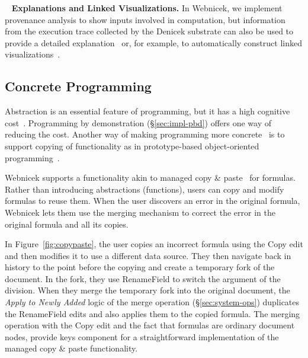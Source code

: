 \documentclass[sigconf,anonymous,screen]{acmart}
\newcommand{\ident}[1]{{\sffamily #1}}
\newcommand{\note}[1]{\textcolor{red}{#1}}
\DeclareRobustCommand{\keyideabox}[3]{\begin{tcolorbox}[breakable,
  boxsep=5pt,left=0pt,right=0pt,top=0pt,bottom=0pt,width=\dimexpr\columnwidth\relax,
  colback=gray!20,colframe=gray!20,
  enlarge bottom by=0pt,enlarge top by=0pt,
  arc=0pt,outer arc=0pt]
\lettrine[lraise=0.3]{\LARGE #1}{~}
\small \textbf{#2.} #3
\end{tcolorbox}
}
\begin{document}
\keyideabox{\faBarChart}{Explanations and Linked Visualizations}{In Webnicek, we implement
provenance analysis to show inputs involved in computation, but information from the execution
trace collected by the Denicek substrate can also be used to provide a detailed
explanation~\cite{perera-2012-functional} or, for example, to automatically construct
linked visualizations~\cite{perera-2022-linked}.}


\subsection{Concrete Programming}
\label{sec:impl-copy}

Abstraction is an essential feature of programming, but it has a high cognitive
cost~\cite{blackwell-2002-attention}. Programming by demonstration (\S\ref{sec:impl-pbd})
offers one way of reducing the cost. Another way of making programming more
concrete~\cite{edwards-2004-example,smith-1975-pygmalion} is to support copying of functionality
as in prototype-based object-oriented programming~\cite{ungar-1987-self,randall-1995-self}.

Webnicek supports a functionality akin to managed copy \&
paste~\cite{edwards-2006-copypaste,edwards-2022-copypaste} for formulas. Rather than introducing
abstractions (functions), users can copy and modify formulas to reuse them. When the user
discovers an error in the original formula, Webnicek lets them use the merging mechanism to correct
the error in the original formula and all its copies.

In Figure~\ref{fig:copypaste}, the user copies an incorrect formula using
the \ident{Copy} edit and then modifies it to use a different data source. They then navigate back
in history to the point before the copying and create a temporary fork of the document. In the
fork, they use \ident{RenameField} to switch the argument of the division. When they merge the
temporary fork into the original document, the \emph{Apply to Newly Added} logic of the merge
operation (\S\ref{sec:system-ops}) duplicates the \ident{RenameField} edits and also applies them
to the copied formula. The merging operation with the \ident{Copy} edit and the fact that formulas
are ordinary document nodes, provide keys component for a straightforward implementation of the
managed copy \& paste functionality.

\end{document}
